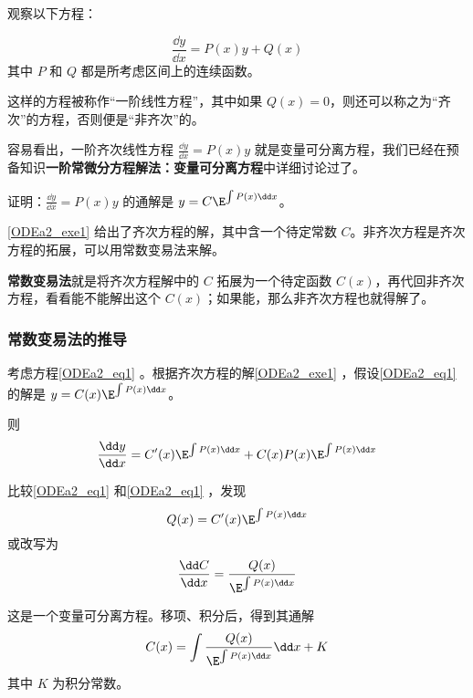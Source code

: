 

观察以下方程：

\begin{equation}\label{ODEa2_eq1}
\frac{\dd y}{\dd x}=P(x)y+Q(x)
\end{equation}
其中 $P$ 和 $Q$ 都是所考虑区间上的连续函数。

这样的方程被称作“一阶线性方程”，其中如果 $Q(x)=0$，则还可以称之为“齐次”的方程，否则便是“非齐次”的。

容易看出，一阶齐次线性方程 $\frac{\dd y}{\dd x}=P(x)y$ 就是变量可分离方程，我们已经在预备知识\textbf{一阶常微分方程解法：变量可分离方程}中详细讨论过了。

\begin{exercise}{}\label{ODEa2_exe1}
证明：$\frac{\dd y}{\dd x}=P(x)y$ 的通解是 $y=C\E^{\int P(x)\dd x}$。
\end{exercise}

\autoref{ODEa2_exe1} 给出了齐次方程的解，其中含一个待定常数 $C$。非齐次方程是齐次方程的拓展，可以用常数变易法来解。

\textbf{常数变易法}就是将齐次方程解中的 $C$ 拓展为一个待定函数 $C(x)$，再代回非齐次方程，看看能不能解出这个 $C(x)$；如果能，那么非齐次方程也就得解了。

\subsubsection{常数变易法的推导}
考虑方程\autoref{ODEa2_eq1} 。根据齐次方程的解\autoref{ODEa2_exe1} ，假设\autoref{ODEa2_eq1} 的解是 $y=C(x)\E^{\int P(x)\dd x}$。

则
\begin{equation}
\begin{aligned}
\frac{\dd y}{\dd x}=C'(x)\E^{\int P(x)\dd x}+C(x)P(x)\E^{\int P(x)\dd x}
\end{aligned}
\end{equation}

比较\autoref{ODEa2_eq1} 和\autoref{ODEa2_eq1} ，发现
\begin{equation}
Q(x)=C'(x)\E^{\int P(x)\dd x}
\end{equation}
或改写为
\begin{equation}
\frac{\dd C}{\dd x}=\frac{Q(x)}{\E^{\int P(x)\dd x}}
\end{equation}

这是一个变量可分离方程。移项、积分后，得到其通解
\begin{equation}
C(x)=\int\frac{Q(x)}{\E^{\int P(x)\dd x}}\dd x+K
\end{equation}
其中 $K$ 为积分常数。

